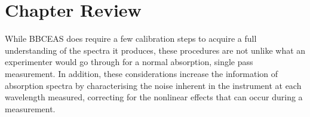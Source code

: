 \section*{Chapter Review}

While \ac{BBCEAS} does require a few calibration steps to acquire a full
understanding of the spectra it produces, these procedures are not unlike what
an experimenter would go through for a normal absorption, single pass
measurement. In addition, these considerations increase the information of
absorption spectra by characterising the noise inherent in the instrument at
each wavelength measured, correcting for the nonlinear
effects that can occur during a measurement.
